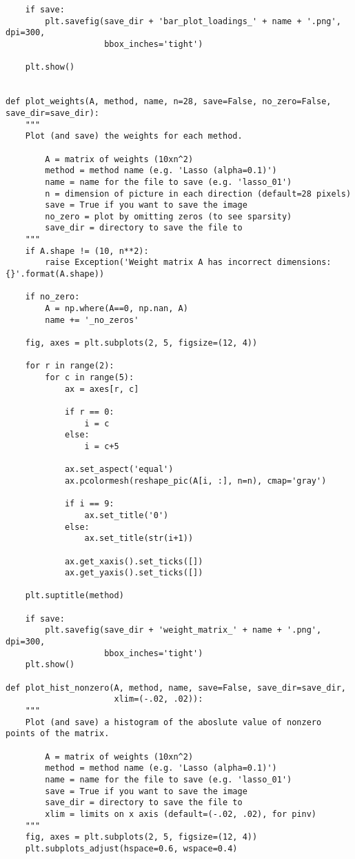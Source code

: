 \documentclass[10pt]{article}
\begin{document}
\begin{lstlisting}
    if save:
        plt.savefig(save_dir + 'bar_plot_loadings_' + name + '.png', dpi=300,
                    bbox_inches='tight')
    
    plt.show()


def plot_weights(A, method, name, n=28, save=False, no_zero=False, save_dir=save_dir):
    """
    Plot (and save) the weights for each method.
    
        A = matrix of weights (10xn^2)
        method = method name (e.g. 'Lasso (alpha=0.1)')
        name = name for the file to save (e.g. 'lasso_01')
        n = dimension of picture in each direction (default=28 pixels)
        save = True if you want to save the image
        no_zero = plot by omitting zeros (to see sparsity)
        save_dir = directory to save the file to
    """
    if A.shape != (10, n**2):
        raise Exception('Weight matrix A has incorrect dimensions: {}'.format(A.shape))
    
    if no_zero:
        A = np.where(A==0, np.nan, A)
        name += '_no_zeros'
    
    fig, axes = plt.subplots(2, 5, figsize=(12, 4))

    for r in range(2):
        for c in range(5):
            ax = axes[r, c]
            
            if r == 0:
                i = c
            else:
                i = c+5
        
            ax.set_aspect('equal')
            ax.pcolormesh(reshape_pic(A[i, :], n=n), cmap='gray')
        
            if i == 9:
                ax.set_title('0')
            else:
                ax.set_title(str(i+1))

            ax.get_xaxis().set_ticks([])
            ax.get_yaxis().set_ticks([])

    plt.suptitle(method)
    
    if save:
        plt.savefig(save_dir + 'weight_matrix_' + name + '.png', dpi=300,
                    bbox_inches='tight')
    plt.show()

def plot_hist_nonzero(A, method, name, save=False, save_dir=save_dir,
                      xlim=(-.02, .02)):
    """
    Plot (and save) a histogram of the aboslute value of nonzero points of the matrix.
    
        A = matrix of weights (10xn^2)
        method = method name (e.g. 'Lasso (alpha=0.1)')
        name = name for the file to save (e.g. 'lasso_01')
        save = True if you want to save the image
        save_dir = directory to save the file to
        xlim = limits on x axis (default=(-.02, .02), for pinv)
    """
    fig, axes = plt.subplots(2, 5, figsize=(12, 4))
    plt.subplots_adjust(hspace=0.6, wspace=0.4)
    

\end{lstlisting}
\end{document}

